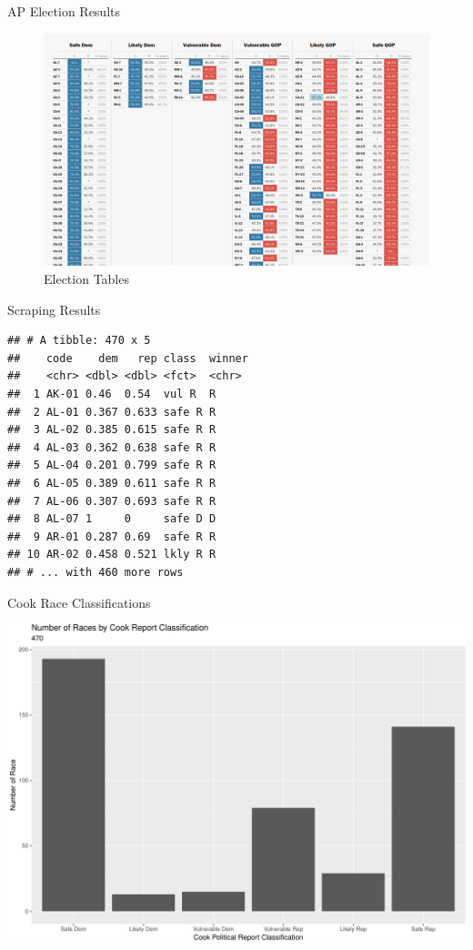 \documentclass[ignorenonframetext,]{beamer}
\begin{document}
\begin{frame}{AP Election Results}

\begin{figure}
\centering
\includegraphics{election_table.png}
\caption{Election Tables}
\end{figure}

\end{frame}

\begin{frame}[fragile]{Scraping Results}

\begin{verbatim}
## # A tibble: 470 x 5
##    code    dem   rep class  winner
##    <chr> <dbl> <dbl> <fct>  <chr> 
##  1 AK-01 0.46  0.54  vul R  R     
##  2 AL-01 0.367 0.633 safe R R     
##  3 AL-02 0.385 0.615 safe R R     
##  4 AL-03 0.362 0.638 safe R R     
##  5 AL-04 0.201 0.799 safe R R     
##  6 AL-05 0.389 0.611 safe R R     
##  7 AL-06 0.307 0.693 safe R R     
##  8 AL-07 1     0     safe D D     
##  9 AR-01 0.287 0.69  safe R R     
## 10 AR-02 0.458 0.521 lkly R R     
## # ... with 460 more rows
\end{verbatim}

\end{frame}

\begin{frame}{Cook Race Classifications}

\includegraphics{markets_models_files/figure-beamer/class all-1.pdf}

\end{frame}
\end{document}
